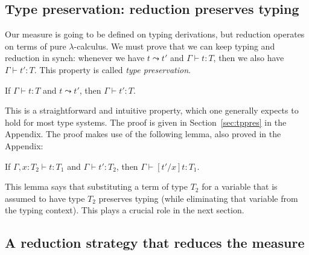 \documentclass{article}
\begin{document}
\subsection{Type preservation: reduction preserves typing}

Our measure is going to be defined on typing derivations, but reduction
operates on terms of pure $\lambda$-calculus.  We must prove that we can
keep typing and reduction in synch: whenever we have $t \leadsto t'$ and
$\Gamma \vdash t : T$, then we also have $\Gamma \vdash t' : T$.  This
property is called \emph{type preservation}.

\vspace{.25cm}
\begin{theorem}
\label{thm:tppres}
If $\Gamma\vdash t : T$ and $t \leadsto t'$, then $\Gamma\vdash t' : T$.
\end{theorem}

This is a straightforward and intuitive property, which one generally
expects to hold for most type systems.  The proof is given in Section~\ref{sec:tppres}
in the Appendix.  The proof makes use of the following lemma, also proved in the Appendix:

\vspace{.25cm}
\begin{lemma}[Substitution]
\label{lem:stlcsubst}
If $\Gamma, x:T_2 \vdash t : T_1$ and $\Gamma \vdash t' : T_2$, then
$\Gamma \vdash [t'/x]t : T_1$.
\end{lemma}

\noindent This lemma says that substituting a term of type $T_2$ for a variable that
is assumed to have type $T_2$ preserves typing (while eliminating that
variable from the typing context).  This plays a crucial role in the next section.
  
\subsection{A reduction strategy that reduces the measure}
\label{sec:mudec}
\end{document}
